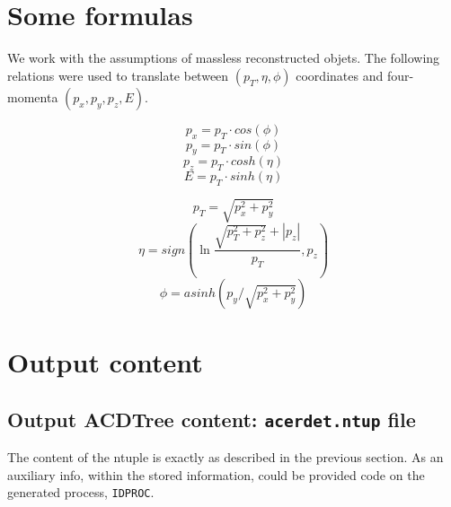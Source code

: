 \section{Some formulas}

We work with the assumptions of massless reconstructed objets. The
following relations were used to translate between $(p_T, \eta, \phi)$
coordinates and four-momenta $(p_x, p_y, p_z, E)$.

\begin{equation}
 p_x=p_T \cdot cos(\phi) 
\end{equation}
\begin{equation}
 p_y=p_T \cdot sin(\phi)
\end{equation}
\begin{equation}
 p_z=p_T \cdot cosh(\eta) 
\end{equation}
\begin{equation}
 E  =p_T \cdot sinh(\eta)
\end{equation}

\begin{equation}
 p_T = \sqrt{p_x^2 + p_y^2}
\end{equation}
\begin{equation}
\eta = sign(\ln{\frac{\sqrt{p_T^2+p_z^2}+|p_z|}{p_T}},p_z)
\end{equation}
\begin{equation}
 \phi = asinh(p_y/\sqrt{p_x^2+p_y^2}) 
\end{equation}

\newpage
\section{Output content}

\subsection{Output ACDTree content: {\tt acerdet.ntup} file}
The content of the ntuple is exactly as described in the previous
section. As an auxiliary info, within the stored information,
could be provided code on the generated process, {\tt IDPROC}.

